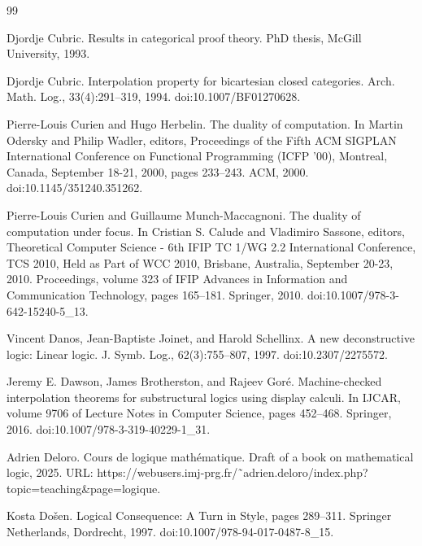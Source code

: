 \documentclass[10pt,a4paper]{article}
\begin{document}
\begin{thebibliography}{99}
\par\noindent    Djordje Cubric.  Results in categorical proof theory.  PhD thesis, McGill University, 1993.  

\par\noindent    Djordje Cubric.  Interpolation property for bicartesian closed categories.  Arch. Math. Log., 33(4):291–319, 1994.  doi:10.1007/BF01270628.  

\par\noindent    Pierre-Louis Curien and Hugo Herbelin.  The duality of computation.  In Martin Odersky and Philip Wadler, editors, Proceedings of the Fifth ACM SIGPLAN International Conference on Functional Programming (ICFP ’00), Montreal, Canada, September 18-21, 2000, pages 233–243. ACM, 2000.  doi:10.1145/351240.351262.  

\par\noindent    Pierre-Louis Curien and Guillaume Munch-Maccagnoni.  The duality of computation under focus.  In Cristian S. Calude and Vladimiro Sassone, editors, Theoretical Computer Science - 6th IFIP TC 1/WG 2.2 International Conference, TCS 2010, Held as Part of WCC 2010, Brisbane, Australia, September 20-23, 2010. Proceedings, volume 323 of IFIP Advances in Information and Communication Technology, pages 165–181. Springer, 2010.  doi:10.1007/978-3-642-15240-5\_13.  

\par\noindent    Vincent Danos, Jean-Baptiste Joinet, and Harold Schellinx.  A new deconstructive logic: Linear logic.  J. Symb. Log., 62(3):755–807, 1997.  doi:10.2307/2275572.  

\par\noindent    Jeremy E. Dawson, James Brotherston, and Rajeev Goré.  Machine-checked interpolation theorems for substructural logics using display calculi.  In IJCAR, volume 9706 of Lecture Notes in Computer Science, pages 452–468. Springer, 2016.  doi:10.1007/978-3-319-40229-1\_31.  

\par\noindent    Adrien Deloro.  Cours de logique mathématique.  Draft of a book on mathematical logic, 2025.  URL: https://webusers.imj-prg.fr/˜adrien.deloro/index.php?topic=teaching\&page=logique.  

\par\noindent    Kosta Došen.  Logical Consequence: A Turn in Style, pages 289–311.  Springer Netherlands, Dordrecht, 1997.  doi:10.1007/978-94-017-0487-8\_15.  


\end{thebibliography}
\end{document}
